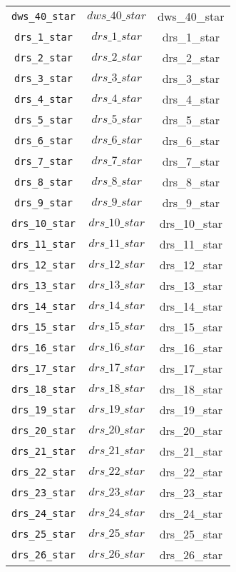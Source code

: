 \begin{center}
\begin{longtable}{ccc}
\texttt{dws\_40\_star} & $dws\_40\_star$ & dws\_40\_star\\
\texttt{drs\_1\_star} & $drs\_1\_star$ & drs\_1\_star\\
\texttt{drs\_2\_star} & $drs\_2\_star$ & drs\_2\_star\\
\texttt{drs\_3\_star} & $drs\_3\_star$ & drs\_3\_star\\
\texttt{drs\_4\_star} & $drs\_4\_star$ & drs\_4\_star\\
\texttt{drs\_5\_star} & $drs\_5\_star$ & drs\_5\_star\\
\texttt{drs\_6\_star} & $drs\_6\_star$ & drs\_6\_star\\
\texttt{drs\_7\_star} & $drs\_7\_star$ & drs\_7\_star\\
\texttt{drs\_8\_star} & $drs\_8\_star$ & drs\_8\_star\\
\texttt{drs\_9\_star} & $drs\_9\_star$ & drs\_9\_star\\
\texttt{drs\_10\_star} & $drs\_10\_star$ & drs\_10\_star\\
\texttt{drs\_11\_star} & $drs\_11\_star$ & drs\_11\_star\\
\texttt{drs\_12\_star} & $drs\_12\_star$ & drs\_12\_star\\
\texttt{drs\_13\_star} & $drs\_13\_star$ & drs\_13\_star\\
\texttt{drs\_14\_star} & $drs\_14\_star$ & drs\_14\_star\\
\texttt{drs\_15\_star} & $drs\_15\_star$ & drs\_15\_star\\
\texttt{drs\_16\_star} & $drs\_16\_star$ & drs\_16\_star\\
\texttt{drs\_17\_star} & $drs\_17\_star$ & drs\_17\_star\\
\texttt{drs\_18\_star} & $drs\_18\_star$ & drs\_18\_star\\
\texttt{drs\_19\_star} & $drs\_19\_star$ & drs\_19\_star\\
\texttt{drs\_20\_star} & $drs\_20\_star$ & drs\_20\_star\\
\texttt{drs\_21\_star} & $drs\_21\_star$ & drs\_21\_star\\
\texttt{drs\_22\_star} & $drs\_22\_star$ & drs\_22\_star\\
\texttt{drs\_23\_star} & $drs\_23\_star$ & drs\_23\_star\\
\texttt{drs\_24\_star} & $drs\_24\_star$ & drs\_24\_star\\
\texttt{drs\_25\_star} & $drs\_25\_star$ & drs\_25\_star\\
\texttt{drs\_26\_star} & $drs\_26\_star$ & drs\_26\_star\\

\end{longtable}
\end{center}
